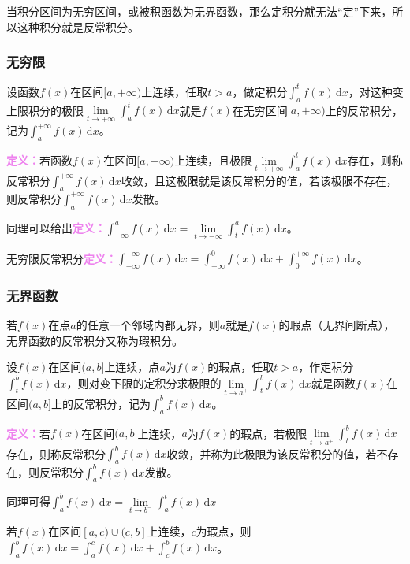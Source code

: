 \documentclass[UTF8, 12pt]{ctexart}
\begin{document}
当积分区间为无穷区间，或被积函数为无界函数，那么定积分就无法“定”下来，所以这种积分就是反常积分。

\subsubsection{无穷限}

设函数$f(x)$在区间$[a,+\infty)$上连续，任取$t>a$，做定积分$\int_a^tf(x)\,\textrm{d}x$，对这种变上限积分的极限$\lim\limits_{t\to+\infty}\int_a^tf(x)\,\textrm{d}x$就是$f(x)$在无穷区间$[a,+\infty)$上的反常积分，记为$\int_a^{+\infty}f(x)\,\textrm{d}x$。

\textcolor{violet}{\textbf{定义：}}若函数$f(x)$在区间$[a,+\infty)$上连续，且极限$\lim\limits_{t\to+\infty}\int_a^tf(x)\,\textrm{d}x$存在，则称反常积分$\int_a^{+\infty}f(x)\,\textrm{d}x$收敛，且这极限就是该反常积分的值，若该极限不存在，则反常积分$\int_a^{+\infty}f(x)\,\textrm{d}x$发散。

同理可以给出\textcolor{violet}{\textbf{定义：}}$\int_{-\infty}^af(x)\,\textrm{d}x=\lim\limits_{t\to-\infty}\int_t^af(x)\,\textrm{d}x$。

无穷限反常积分\textcolor{violet}{\textbf{定义：}}$\int_{-\infty}^{+\infty}f(x)\,\textrm{d}x=\int_{-\infty}^0f(x)\,\textrm{d}x+\int_0^{+\infty}f(x)\,\textrm{d}x$。

\subsubsection{无界函数}

若$f(x)$在点$a$的任意一个邻域内都无界，则$a$就是$f(x)$的瑕点（无界间断点），无界函数的反常积分又称为瑕积分。

设$f(x)$在区间$(a,b]$上连续，点$a$为$f(x)$的瑕点，任取$t>a$，作定积分$\int_t^bf(x)\,\textrm{d}x$，则对变下限的定积分求极限的$\lim\limits_{t\to a^+}\int_t^bf(x)\,\textrm{d}x$就是函数$f(x)$在区间$(a,b]$上的反常积分，记为$\int_a^bf(x)\,\textrm{d}x$。

\textcolor{violet}{\textbf{定义：}}若$f(x)$在区间$(a,b]$上连续，$a$为$f(x)$的瑕点，若极限$\lim\limits_{t\to a^+}\int_t^bf(x)\,\textrm{d}x$存在，则称反常积分$\int_a^bf(x)\,\textrm{d}x$收敛，并称为此极限为该反常积分的值，若不存在，则反常积分$\int_a^bf(x)\,\textrm{d}x$发散。

同理可得$\int_a^bf(x)\,\textrm{d}x=\lim\limits_{t\to b^-}\int_a^tf(x)\,\textrm{d}x$

若$f(x)$在区间$[a,c)\cup(c,b]$上连续，$c$为瑕点，则$\int_a^bf(x)\,\textrm{d}x=\int_a^cf(x)\,\textrm{d}x+\int_c^bf(x)\,\textrm{d}x$。
\end{document}
